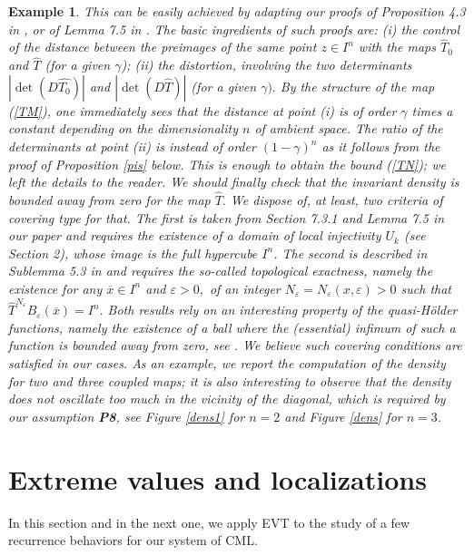 \documentclass[12pt,reqno,a4paper]{amsart}
\newtheorem{example}[thm]{Example}
\let\epsilon\varepsilon
\begin{document}
\begin{example}
This can be easily achieved by adapting our proofs of Proposition 4.3 in \cite{AFV}, or of Lemma 7.5 in \cite{HNTV}. The basic ingredients of such proofs are: (i) the control of the distance between the preimages of the same point $z\in I^n$ with the maps $\hat{T}_0$ and $\hat{T}$ (for a given $\gamma$); (ii) the distortion, involving the two determinants $|\det(D\hat{T_0})|$ and $|\det(D\hat{T})|$ (for a given $\gamma).$ By the structure of the map (\ref{TM}), one immediately sees that the distance at point (i) is of order $\gamma$ times a constant depending on the dimensionality $n$ of ambient space. The ratio of the determinants at point (ii) is instead of order $(1-\gamma)^n$ as it follows from the proof of Proposition \ref{pis} below. This is enough to obtain the bound (\ref{TN}); we left the details to the reader. We should finally check that the invariant density is bounded away from zero for the map $\hat{T}.$ We dispose of, at least, two criteria of {\em covering} type for that. The first is taken from Section 7.3.1 and Lemma 7.5 in our paper \cite{HNTV} and requires the existence of a  domain of local injectivity $U_k$ (see Section 2),  whose image is the full hypercube $I^n$. The second is described in Sublemma 5.3 in \cite{HV} and requires the so-called {\em topological exactness}, namely the existence for any
$\overline{x}\in I^n$ and $\epsilon>0,$ of an integer $N_{\epsilon} = N_{\epsilon}(x, \epsilon) > 0$ such that $\hat{T}^{N_{\epsilon}}B_{\epsilon}(\overline{x})=I^n.$ Both results rely on an interesting property of the quasi-H\"older functions, namely the existence of a ball where the (essential) infimum of such a function is bounded away from zero, see \cite{S}. We believe such covering  conditions are satisfied in our cases. As an example, we report the computation of the density for two and three  coupled maps;  it is also interesting to observe that the density does not oscillate too much in the vicinity of the diagonal, which is required by our assumption {\bf P8}, see Figure \ref{dens1} for $n=2$ and Figure \ref{dens} for $n=3$.


\end{example}



\section{Extreme values and localizations}\label{EVTL}
 In this section and in the next one, we apply EVT to the study of a few recurrence behaviors for our system of CML.
\end{document}
